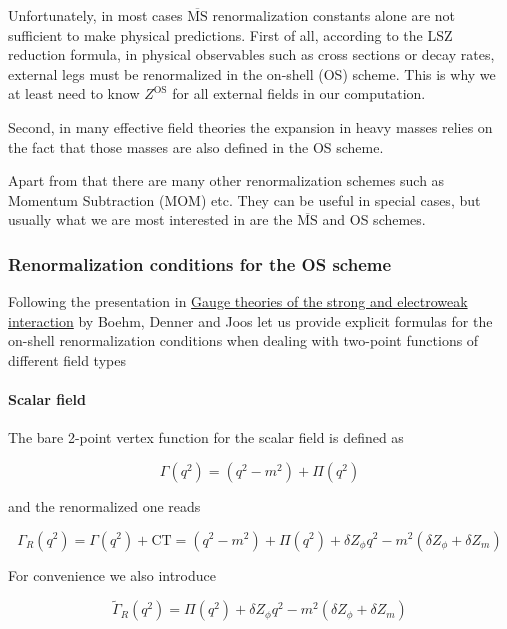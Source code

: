\documentclass[../FeynCalcManual.tex]{subfiles}
\begin{document}
Unfortunately, in most cases \(\overline{\textrm{MS}}\) renormalization
constants alone are not sufficient to make physical predictions. First
of all, according to the LSZ reduction formula, in physical observables
such as cross sections or decay rates, external legs must be
renormalized in the on-shell (OS) scheme. This is why we at least need
to know \(Z^{\textrm{OS}}\) for all external fields in our computation.

Second, in many effective field theories the expansion in heavy masses
relies on the fact that those masses are also defined in the OS scheme.

Apart from that there are many other renormalization schemes such as
Momentum Subtraction (MOM) etc. They can be useful in special cases, but
usually what we are most interested in are the
\(\overline{\textrm{MS}}\) and OS schemes.

\subsubsection{Renormalization conditions for the OS
scheme}\label{renormalization-conditions-for-the-os-scheme}

Following the presentation in
\href{https://inspirehep.net/literature/571258}{Gauge theories of the
strong and electroweak interaction} by Boehm, Denner and Joos let us
provide explicit formulas for the on-shell renormalization conditions
when dealing with two-point functions of different field types

\paragraph{Scalar field}\label{scalar-field}

The bare 2-point vertex function for the scalar field is defined as

\begin{equation}
\Gamma(q^2) = (q^2 - m^2) + \Pi(q^2)
\end{equation}

and the renormalized one reads

\begin{equation}
\Gamma_R(q^2) = \Gamma(q^2) + \textrm{CT} = (q^2 - m^2) + \Pi(q^2) + \delta Z_{\phi} q^2 - m^2 (\delta Z_{\phi} + \delta Z_{m}   )
\end{equation}

For convenience we also introduce

\begin{equation}
\tilde{\Gamma}_R(q^2) = \Pi(q^2) + \delta Z_{\phi} q^2 - m^2 (\delta Z_{\phi} + \delta Z_{m}   )
\end{equation}
\end{document}
